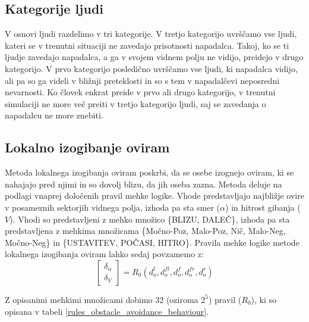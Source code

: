 \documentclass[9pt]{pnas-new}
\begin{document}
\subsection*{Kategorije ljudi}
\label{kategorije_ljudi}
V osnovi ljudi razdelimo v tri kategorije. V tretjo kategorijo uvrščamo vse ljudi, kateri se v trenutni situaciji ne zavedajo prisotnosti napadalca. Takoj, ko se ti ljudje zavedajo napadalca, a ga v svojem vidnem polju ne vidijo, preidejo v drugo kategorijo. V prvo kategorijo posledično uvrščamo vse ljudi, ki napadalca vidijo, ali pa so ga videli v bližnji preteklosti in so s tem v napadalčevi neposredni nevarnosti. Ko človek enkrat preide v prvo ali drugo kategorijo, v trenutni simulaciji ne more več preiti v tretjo kategorijo ljudi, saj se zavedanja o napadalcu ne more znebiti.

\subsection*{Lokalno izogibanje oviram}
\label{lokalno_izogibanje_oviram}
Metoda lokalnega izogibanja oviram poskrbi, da se osebe izognejo oviram, ki se nahajajo pred njimi in so dovolj blizu, da jih oseba zazna. Metoda deluje na podlagi vnaprej določenih pravil mehke logike. Vhode predstavljajo najbližje ovire v posameznih sektorjih vidnega polja, izhoda pa sta smer ($\alpha$) in hitrost gibanja ($V$). Vhodi so predstavljeni z mehko množico \{BLIZU, DALEČ\}, izhoda pa sta predstavljena z mehkima množicama \{Močno-Poz, Malo-Poz, Nič, Malo-Neg, Močno-Neg\} in \{USTAVITEV, POČASI, HITRO\}. Pravila mehke logike metode lokalnega izogibanja oviram lahko sedaj povzamemo z:
\begin{equation}
\label{lokalno_izogibanje_oviram_summarize}
\begin{bmatrix}
\delta_{\alpha}\\
\delta_{V}
\end{bmatrix} = R_{0} (d_{o}^{l}, d_{o}^{fl}, d_{o}^{f}, d_{o}^{fr}, d_{o}^{r})
\end{equation}

\noindent Z opisanimi mehkimi množicami dobimo 32 (oziroma $2^5$) pravil ($R_0$), ki so opisana v tabeli \ref{rules_obstacle_avoidance_behaviour}.
\end{document}
